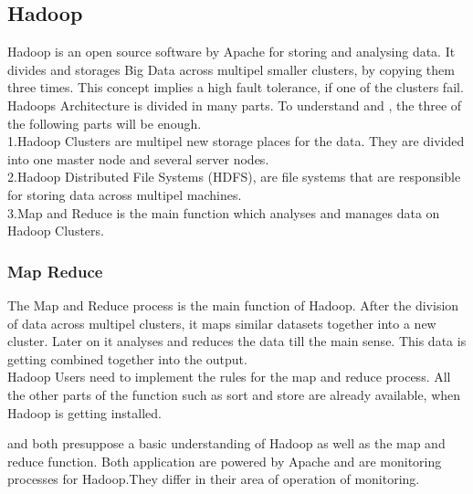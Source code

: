 \subsection{Hadoop}
\label{subsec:Hadoop}
Hadoop is an open source software by Apache for storing and analysing data. It divides and storages Big Data across multipel smaller clusters, by copying them three times. This concept implies a high fault tolerance, if one of the clusters fail.
 \\
 Hadoops Architecture is divided in many parts. To understand \amb and \chuk, the three of the following parts will be enough.
  \\
  1.Hadoop Clusters are multipel new storage places for the data. They are divided into one master node and several server nodes.
  \\
  2.Hadoop Distributed File Systems (HDFS), are file systems that are responsible for storing data across multipel machines.
  \\
  3.Map and Reduce is the main function which analyses and manages data on Hadoop Clusters.
\subsubsection*{Map Reduce}
The Map and Reduce process is the main function of Hadoop. After the division of data across multipel clusters, it maps similar datasets together into a new cluster. Later on it analyses and reduces the data till the main sense. This data is getting combined together into the output. 
\\
Hadoop Users need to implement the rules for the map and reduce process. All the other parts of the function such as sort and store are already available, when Hadoop is getting installed.


\amb and \chuk both presuppose a basic understanding of Hadoop as well as the map and reduce function. Both application are powered by Apache and are monitoring processes for Hadoop.They differ in their area of operation of monitoring. 
